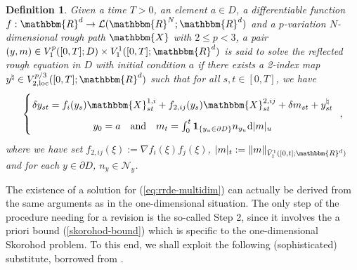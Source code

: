\documentclass[11pt,reqno,oneside]{amsart}
\numberwithin{equation}{section}
\newcommand{\assign}{:=}
\newcommand{\mathd}{\mathrm{d}}
\newcommand{\cn}{{\mathcal N}}
\newtheorem{definition}[theorem]{Definition}
\begin{document}
\begin{definition}\label{def:sol-rrde-multidim}
Given a time $T > 0$, an element $a\in D$, a differentiable function $f :\mathbbm{R}^d \to \mathcal{L} (\mathbbm{R}^N ;\mathbbm{R}^d)$ and a $p$-variation $N$-dimensional rough path $\mathbbm{X}$ with $2\leqslant p<3$, a pair $(y, m)\in  V^p_1 ([0, T] ; D) \times V^1_1 ([0, T] ;\mathbbm{R}^d)$ is said to solve the reflected rough equation in $D$ with initial condition $a$ if there exists a 2-index map $y^\natural \in V^{p/3}_{2, \text{loc}}([0,T];\mathbbm{R}^d)$ such that for all $s,t\in [0,T]$, we have
\begin{equation}
\left\lbrace
\arraycolsep=1pt\def\arraystretch{1.8}
  \begin{array}{c}
   \delta y_{s t} = f_i (y_s) \mathbbm{X}^{1,i}_{s t} + f_{2,ij} (y_s)
    \mathbbm{X}^{2,ij}_{s t} + \delta m_{s t} +y^\natural_{st} \\
    y_0=a \quad \text{and} \quad m_t=\int_0^t \mathbf{1}_{\{ y_u\in \partial D\}}n_{y_u}  \mathd |m|_u 
  \end{array} \label{eq:rrde-multidim}
	\right. \ ,
\end{equation}
where we have set $f_{2,ij} (\xi) \assign \nabla f_i (\xi)f_j (\xi)$, $|m|_t:=\|m\|_{\bar{V}^1_1 ([0, t] ; \mathbbm{R}^d)}$ and for each $y\in \partial D$, $n_y \in \cn_{y}$.
\end{definition}

\smallskip

The existence of a solution for (\ref{eq:rrde-multidim}) can actually be derived from the same arguments as in the one-dimensional situation. The only step of the procedure needing for a revision is the so-called Step 2, since it involves the a priori bound (\ref{skorohod-bound}) which is specific to the one-dimensional Skorohod problem. To this end, we shall exploit the following (sophisticated) substitute, borrowed from  \cite[Lemma 2.2]{aida_reflected_2015}.
\end{document}
